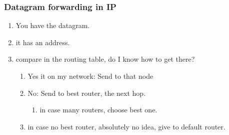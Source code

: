 \documentclass[11pt, a4paper]{article}
\begin{document}
\subsubsection{Datagram forwarding in IP}
\begin{enumerate}
    \item You have the datagram.
    \item it has an address.
    \item compare in the routing table, do I know how to get there?
    \begin{enumerate}
        \item Yes it on my network: Send to that node
        \item No: Send to best router, the next hop.
        \begin{enumerate}
            \item in case many routers, choose best one.
        \end{enumerate}
        \item in case no best router, absolutely no idea, give to default router.
    \end{enumerate}
\end{enumerate}
\end{document}
